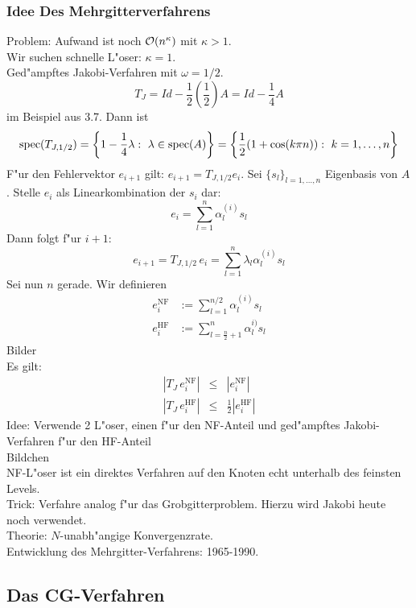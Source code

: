 \documentclass{scrartcl}
\begin{document}
\subsubsection{Idee Des Mehrgitterverfahrens}
Problem: Aufwand ist noch $\mathcal{O}(n^{\kappa})$ mit $\kappa > 1$. \\
Wir suchen schnelle L"oser: $\kappa = 1$. \\
Ged"ampftes Jakobi-Verfahren mit $\omega = 1/2$.
$$ T_J = Id - \frac{1}{2}(\frac{1}{2})A = Id - \frac14 A$$
im Beispiel aus 3.7.
Dann ist 
$$ \spec(T_{J,1/2}) = \left\{ 1 - \frac14 \lambda: \ \lambda \in \spec(A) \right\} = \left\{ \frac{1}{2} ( 1 + \cos ( k \pi n)): \ k=1, \ldots, n \right\}$$
F"ur den Fehlervektor $e_{i+1}$ gilt: $e_{i+1} = T_{J, 1/2} e_i$. Sei $\{ s_l \}_{l=1, \ldots, n}$ Eigenbasis von $A$. Stelle $e_i$ als Linearkombination der $s_i$ dar: \\
$$ e_i = \sum\limits_{l=1}^n \alpha_l^{(i)} s_l $$ 
Dann folgt f"ur $i+1$:
$$e_{i+1} = T_{J, 1/2} \,e_i = \sum\limits_{l=1}^n \lambda_l \alpha_l^{(i)} s_l $$
Sei nun $n$ gerade. Wir definieren
\begin{align}
e_i^\mathrm{NF} & := \sum\limits_{l=1}^{n/2} \alpha_l^{(i)} s_l  \tag{Niederfrequenter Anteil}\\
e_i^\mathrm{HF} & := \sum\limits_{l=\frac n2 +1}^n \alpha_l^{i)} s_l \tag{Hochfrequenter Anteil}
\end{align}
Bilder \\
Es gilt:
\begin{eqnarray*}
\left\vert T_J \, e_i^\mathrm{NF} \right\vert & \leq & \left\vert e_i^\mathrm{NF} \right\vert \\
\left \vert T_J \, e_i^\mathrm{HF} \right\vert & \leq & \frac12 \left\vert e_i^\mathrm{HF} \right\vert 
\end{eqnarray*}
Idee: Verwende 2 L"oser, einen f"ur den NF-Anteil und ged"ampftes Jakobi-Verfahren f"ur den HF-Anteil \\
Bildchen \\
NF-L"oser ist ein direktes Verfahren auf den Knoten echt unterhalb des feinsten Levels. \\
Trick: Verfahre analog f"ur das Grobgitterproblem. Hierzu wird Jakobi heute noch verwendet. \\
Theorie: $N$-unabh"angige Konvergenzrate. \\
Entwicklung des Mehrgitter-Verfahrens: 1965-1990.


\subsection{Das CG-Verfahren}
\end{document}
